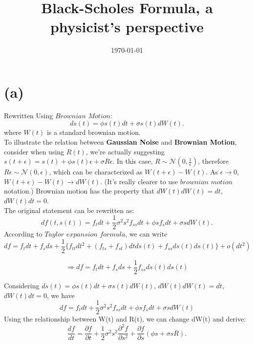 \documentclass[12pt,a4paper]{paper}
\title{Black-Scholes Formula, a physicist's perspective}
\author{}
\date{\today}
\begin{document}
\maketitle
\section{(a)}
Rewritten Using $Brownian$ $Motion$: 
\begin{equation}
ds(t) = \phi s(t) dt + \sigma s(t) dW(t).
\end{equation}
where $W(t)$ is a standard brownian motion.\\\indent To illustrate the relation between \textbf{Gaussian Noise} and \textbf{Brownian Motion}, consider when using $R(t)$, we're actually suggesting $s(t + \epsilon) = s(t) + \phi s(t) \epsilon + \sigma R \epsilon$. In this case, $R \sim \mathcal{N}(0, \frac{1}{\epsilon})$, therefore $R \epsilon \sim \mathcal{N}(0, \epsilon)$, which can be characterized as $W(t + \epsilon) - W(t)$. As $\epsilon \rightarrow 0$, $W(t + \epsilon) - W(t) \rightarrow dW(t)$. (It's really clearer to use $brownian$ $motion$ notation.) Brownian motion has the property that $dW(t)dW(t) = dt$, $dW(t) dt = 0$.\\
\indent The original statement can be rewritten as: 
\begin{equation}
df(t, s(t)) = f_t dt + \frac{1}{2}\sigma^2s^2f_{ss}dt + \phi s f_s dt + \sigma s dW(t).
\end{equation}
\indent According to $Taylor$ $expansion$ $formula$, we can write
\begin{equation} 
df = f_t dt + f_s ds + \frac{1}{2}\{f_{tt} dt^2 + (f_{ts} + f_{st})dt ds(t) + f_{ss} ds(t)ds(t) \} + o(dt^2)
\end{equation} 

\begin{equation}
\Longrightarrow df = f_t dt + f_s ds + \frac{1}{2} f_{ss} ds(t)ds(t)
\end{equation}

\indent Considering $ds(t) = \phi s(t) dt + \sigma s(t) dW(t)$, $dW(t)dW(t) = dt$, $dW(t) dt = 0$, we have 
\begin{equation}
df = f_t dt + \frac{1}{2}\sigma^2s^2f_{ss}dt + \phi s f_s dt + \sigma s dW(t)
\end{equation}
\indent Using the relationship between W(t) and R(t), we can change dW(t) and derive:
\begin{equation}
\frac{df}{dt}=\frac{\partial f}{\partial t}+\frac{1}{2}\sigma ^{2}s^{2}\frac{\partial^2 f}{\partial s^2}+\frac{\partial f}{\partial s}(\phi s+\sigma sR).
\end{equation}
\end{document}
